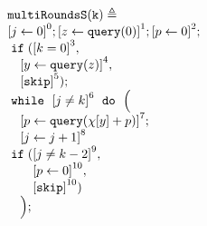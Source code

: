 \begin{example}
        {\small
        \begin{figure}
            \centering
           \quad
           \begin{subfigure}{.35\textwidth}
           \begin{centering}
       {\footnotesize
           $ \begin{array}{l}
                   \kw{multiRoundsS(k)} \triangleq \\
                      \clabel{ \assign{j}{0}}^{0} ; 
                       \clabel{\assign{z}{\query(0)} }^{1} ;             
                       \clabel{\assign{p}{0} }^{2} ; \\
                       \eif(\clabel{ k = 0}^{3}, \\
                        \quad \clabel{ \assign{y}{\query(z)}}^{4}, \\
                        \quad \clabel{\eskip}^5);\\
                       \ewhile ~ \clabel{j \neq k}^{6} ~ \edo ~ \Big(
                        \\
                        \quad \clabel{\assign{p}{\query(\chi[y]+p)} }^{7}  ; \\
                        \quad \clabel{\assign{j}{j + 1}}^{8}\\
                        \eif(\clabel{ j \neq k - 2}^{9}, \\
                        \quad \quad \clabel{ \assign{p}{0}}^{10} ,\\ 
                        \quad \quad \clabel{\eskip}^{10})\\
                        \quad \Big);\\
                   \end{array}
           $       
       }
           \caption{}
           \end{centering}
           \end{subfigure}
           \begin{subfigure}{.6\textwidth}
               \begin{centering}
\end{centering}
\end{subfigure}
\end{figure}}
\end{example}
